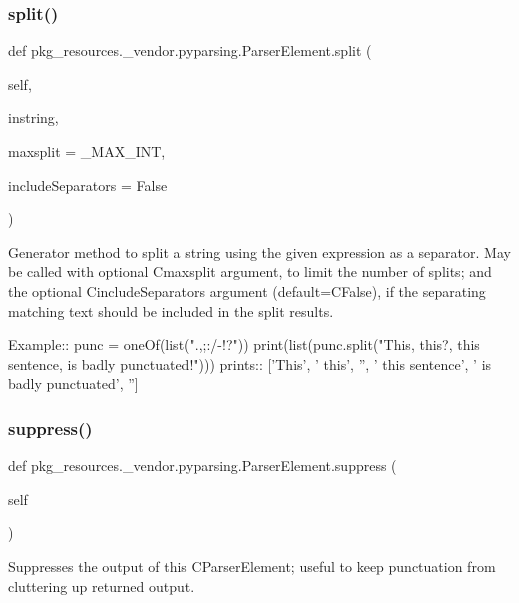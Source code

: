 \subsubsection{\texorpdfstring{split()}{split()}}
{\footnotesize\ttfamily def pkg\+\_\+resources.\+\_\+vendor.\+pyparsing.\+Parser\+Element.\+split (\begin{DoxyParamCaption}\item[{}]{self,  }\item[{}]{instring,  }\item[{}]{maxsplit = {\ttfamily \+\_\+MAX\+\_\+INT},  }\item[{}]{include\+Separators = {\ttfamily False} }\end{DoxyParamCaption})}

\begin{DoxyVerb}Generator method to split a string using the given expression as a separator.
May be called with optional C{maxsplit} argument, to limit the number of splits;
and the optional C{includeSeparators} argument (default=C{False}), if the separating
matching text should be included in the split results.

Example::        
    punc = oneOf(list(".,;:/-!?"))
    print(list(punc.split("This, this?, this sentence, is badly punctuated!")))
prints::
    ['This', ' this', '', ' this sentence', ' is badly punctuated', '']
\end{DoxyVerb}
 \mbox{\label{classpkg__resources_1_1__vendor_1_1pyparsing_1_1_parser_element_a97cc767ada83556a906a749714ccb9a7}} 
\subsubsection{\texorpdfstring{suppress()}{suppress()}}
{\footnotesize\ttfamily def pkg\+\_\+resources.\+\_\+vendor.\+pyparsing.\+Parser\+Element.\+suppress (\begin{DoxyParamCaption}\item[{}]{self }\end{DoxyParamCaption})}

\begin{DoxyVerb}Suppresses the output of this C{ParserElement}; useful to keep punctuation from
cluttering up returned output.
\end{DoxyVerb}
 \mbox{\label{classpkg__resources_1_1__vendor_1_1pyparsing_1_1_parser_element_af9259df34d2c525d5dc935fe4082d40c}} 
